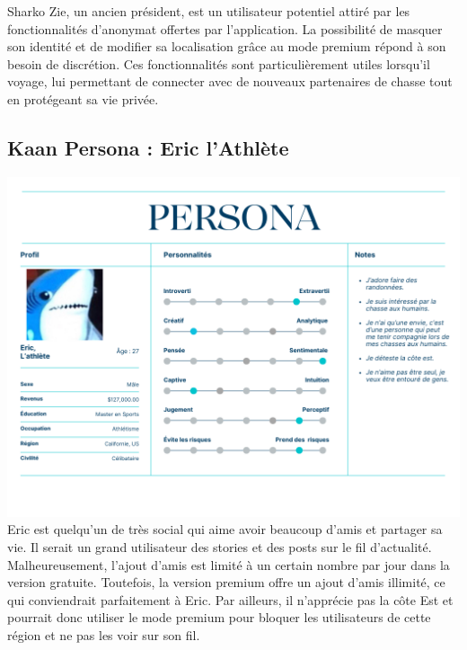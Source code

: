 \documentclass{article}
\begin{document}
Sharko Zie, un ancien président, est un utilisateur potentiel attiré par les fonctionnalités d'anonymat offertes par l'application. 
La possibilité de masquer son identité et de modifier sa localisation grâce au mode premium répond à son besoin de discrétion. 
Ces fonctionnalités sont particulièrement utiles lorsqu'il voyage, lui permettant de connecter avec de nouveaux partenaires de chasse tout en protégeant sa vie privée. \\

\subsection*{Kaan Persona : Eric l’Athlète}
\includegraphics[width=1\textwidth]{photo/Personna_Kaan.png}\\

Eric est quelqu'un de très social qui aime avoir beaucoup d'amis et partager sa vie. Il serait un grand utilisateur des stories et des posts sur le fil d'actualité. 
Malheureusement, l'ajout d'amis est limité à un certain nombre par jour dans la version gratuite. Toutefois, la version premium offre un ajout d'amis illimité, 
ce qui conviendrait parfaitement à Eric. Par ailleurs, il n'apprécie pas la côte Est et pourrait donc utiliser le mode premium pour bloquer les utilisateurs de cette région 
et ne pas les voir sur son fil. \\
\end{document}
